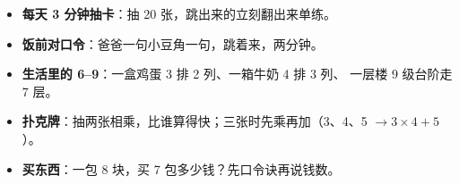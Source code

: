 \begin{itemize}
  \item \textbf{每天 3 分钟抽卡}：抽 20 张，跳出来的立刻翻出来单练。
  \item \textbf{饭前对口令}：爸爸一句小豆角一句，跳着来，两分钟。
  \item \textbf{生活里的 6--9}：一盒鸡蛋 3 排 2 列、一箱牛奶 4 排 3 列、
        一层楼 9 级台阶走 7 层。
  \item \textbf{扑克牌}：抽两张相乘，比谁算得快；三张时先乘再加（3、4、5 $\to 3\times4+5$）。
  \item \textbf{买东西}：一包 8 块，买 7 包多少钱？先口令诀再说钱数。
\end{itemize}
